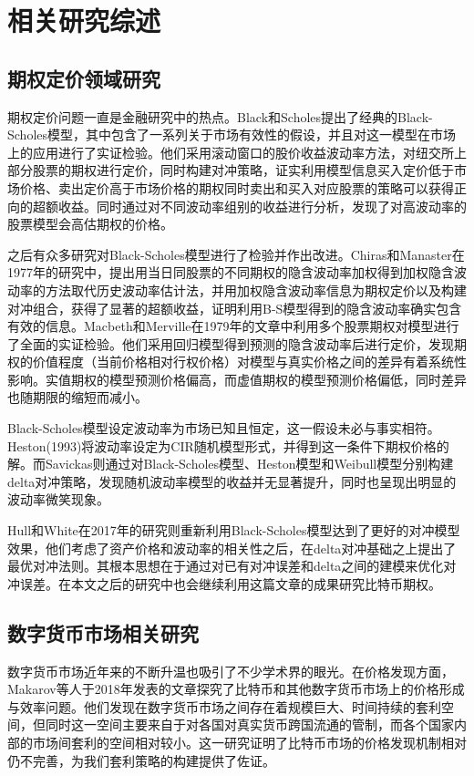 \chapter{相关研究综述}
\section{期权定价领域研究}
\par{
期权定价问题一直是金融研究中的热点。Black和Scholes提出了经典的Black-Scholes模型\cite{10.2307/1831029}，其中包含了一系列关于市场有效性的假设，并且对这一模型在市场上的应用进行了实证检验\cite{J-1972}。他们采用滚动窗口的股价收益波动率方法，对纽交所上部分股票的期权进行定价，同时构建对冲策略，证实利用模型信息买入定价低于市场价格、卖出定价高于市场价格的期权同时卖出和买入对应股票的策略可以获得正向的超额收益。同时通过对不同波动率组别的收益进行分析，发现了对高波动率的股票模型会高估期权的价格。}
\par{
之后有众多研究对Black-Scholes模型进行了检验并作出改进。Chiras和Manaster在1977年的研究中，提出用当日同股票的不同期权的隐含波动率加权得到加权隐含波动率的方法取代历史波动率估计法，并用加权隐含波动率信息为期权定价以及构建对冲组合，获得了显著的超额收益，证明利用B-S模型得到的隐含波动率确实包含有效的信息\cite{CHIRAS1978213}。Macbeth和Merville在1979年的文章中利用多个股票期权对模型进行了全面的实证检验\cite{Jame-1979}。他们采用回归模型得到预测的隐含波动率后进行定价，发现期权的价值程度（当前价格相对行权价格）对模型与真实价格之间的差异有着系统性影响。实值期权的模型预测价格偏高，而虚值期权的模型预测价格偏低，同时差异也随期限的缩短而减小。
}
\par{Black-Scholes模型设定波动率为市场已知且恒定，这一假设未必与事实相符。Heston(1993)将波动率设定为CIR随机模型形式，并得到这一条件下期权价格的解\cite{10.1093/rfs/6.2.327}。而Savickas则通过对Black-Scholes模型、Heston模型和Weibull模型分别构建delta对冲策略，发现随机波动率模型的收益并无显著提升，同时也呈现出明显的波动率微笑现象\cite{Rober-2005}。}
\par{
    Hull和White在2017年的研究则重新利用Black-Scholes模型达到了更好的对冲模型效果，他们考虑了资产价格和波动率的相关性之后，在delta对冲基础之上提出了最优对冲法则\cite{Hull-2017}。其根本思想在于通过对已有对冲误差和delta之间的建模来优化对冲误差。在本文之后的研究中也会继续利用这篇文章的成果研究比特币期权。
}
\section{数字货币市场相关研究}
\par{数字货币市场近年来的不断升温也吸引了不少学术界的眼光。在价格发现方面，Makarov等人于2018年发表的文章探究了比特币和其他数字货币市场上的价格形成与效率问题\cite{Makarov-2018}。他们发现在数字货币市场之间存在着规模巨大、时间持续的套利空间，但同时这一空间主要来自于对各国对真实货币跨国流通的管制，而各个国家内部的市场间套利的空间相对较小。这一研究证明了比特币市场的价格发现机制相对仍不完善，为我们套利策略的构建提供了佐证。
}
